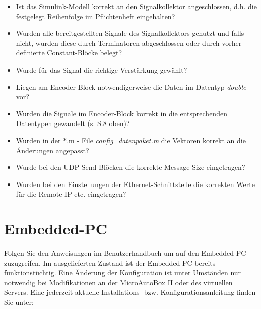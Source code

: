 \documentclass[fontsize = 12pt, paper = a4]{scrreprt}
\begin{document}
\begin{itemize}

\item Ist das Simulink-Modell korrekt an den Signalkollektor angeschlossen, d.h. die festgelegt Reihenfolge im Pflichtenheft eingehalten?

\item Wurden alle bereitgestellten Signale des Signalkollektors genutzt und falls nicht, wurden diese durch Terminatoren abgeschlossen oder durch vorher definierte Constant-Blöcke belegt?

\item Wurde für das Signal die richtige Verstärkung gewählt?

\item Liegen am Encoder-Block notwendigerweise die Daten im Datentyp \textit{double} vor?

\item Wurden die Signale im Encoder-Block korrekt in die entsprechenden Datentypen gewandelt (s. S.8 oben)?

\item Wurden in der *.m - File \textit{config\_datenpaket.m} die Vektoren korrekt an die Änderungen angepasst?

\item Wurde bei den UDP-Send-Blöcken die korrekte Message Size eingetragen?

\item Wurden bei den Einstellungen der Ethernet-Schnittstelle die korrekten Werte für die Remote IP etc. eingetragen?

\end{itemize}

\newpage


\section{Embedded-PC}

Folgen Sie den Anweisungen im Benutzerhandbuch  um auf den Embedded PC zuzugreifen. Im ausgelieferten Zustand ist der Embedded-PC bereits funktionstüchtig. Eine Änderung der Konfiguration ist unter Umständen nur notwendig bei Modifikationen an der MicroAutoBox II oder des virtuellen Servers. Eine jederzeit aktuelle Installations- bzw. Konfigurationsanleitung finden Sie unter:

\vspace*{4mm}
\end{document}
